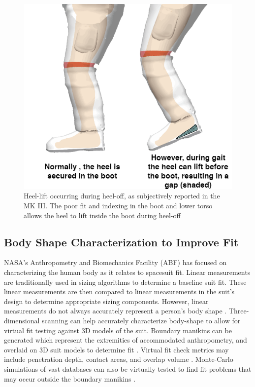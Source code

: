 \documentclass[defaultstyle,11pt]{comps}
\begin{document}
\begin{figure}
\hypertarget{fig:B-HeelLift}{%
\centering
\includegraphics{../fig/Background/HeelLift.png}
\caption{Heel-lift occurring during heel-off, as subjectively reported in the MK III. The poor fit and indexing in the boot and lower torso allows the heel to lift inside the boot during heel-off}\label{fig:B-HeelLift}
}
\end{figure}

\hypertarget{body-shape-characterization-to-improve-fit}{%
\subsection{Body Shape Characterization to Improve Fit}\label{body-shape-characterization-to-improve-fit}}

NASA's Anthropometry and Biomechanics Facility (ABF) has focused on characterizing the human body as it relates to spacesuit fit.
Linear measurements are traditionally used in sizing algorithms to determine a baseline suit fit.
These linear measurements are then compared to linear measurements in the suit's design to determine appropriate sizing components.
However, linear measurements do not always accurately represent a person's body shape \citep{Margerum2010}.
Three-dimensional scanning can help accurately characterize body-shape to allow for virtual fit testing against 3D models of the suit.
Boundary manikins can be generated which represent the extremities of accommodated anthropometry, and overlaid on 3D suit models to determine fit \citep{Margerum2010}.
Virtual fit check metrics may include penetration depth, contact areas, and overlap volume \citep{Kim2019}.
Monte-Carlo simulations of vast databases can also be virtually tested to find fit problems that may occur outside the boundary manikins \citep{Kim2019}.
\end{document}
